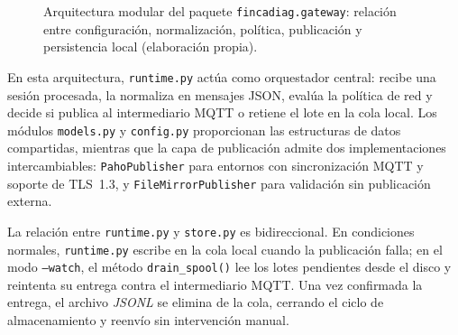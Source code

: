 \begin{figure}[H]
{
}
\caption{Arquitectura modular del paquete \texttt{fincadiag.\allowbreak gateway}: relación entre configuración, normalización, política, publicación y persistencia local (elaboración propia).}
\label{fig:gateway_modules}
\end{figure}

En esta arquitectura, \texttt{runtime.py} actúa como orquestador central: recibe una sesión procesada, la normaliza en mensajes \ac{JSON}, evalúa la política de red y decide si publica al intermediario \ac{MQTT} o retiene el lote en la cola local. Los módulos \texttt{models.py} y \texttt{config.py} proporcionan las estructuras de datos compartidas, mientras que la capa de publicación admite dos implementaciones intercambiables: \texttt{PahoPublisher} para entornos con sincronización \ac{MQTT} y soporte de \ac{TLS}~1.3, y \texttt{FileMirrorPublisher} para validación sin publicación externa.

La relación entre \texttt{runtime.py} y \texttt{store.py} es bidireccional. En condiciones normales, \texttt{runtime.py} escribe en la cola local cuando la publicación falla; en el modo \texttt{--watch}, el método \texttt{drain\_spool()} lee los lotes pendientes desde el disco y reintenta su entrega contra el intermediario \ac{MQTT}. Una vez confirmada la entrega, el archivo \textit{JSONL} se elimina de la cola, cerrando el ciclo de almacenamiento y reenvío sin intervención manual.


